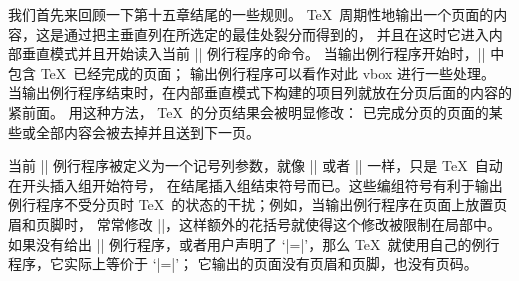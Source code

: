 \ninepoint %
\ddanger 我们首先来回顾一下第十五章结尾的一些规则。%
 \TeX\ 周期性地输出一个页面的内容，这是通过把主垂直列在所选定的最佳处裂分而得到的，
并且在这时它进入内部垂直模式并且开始读入当前 |\output| 例行程序的命令。%
当输出例行程序开始时，|| 中包含 \TeX\ 已经完成的页面；
输出例行程序可以看作对此 vbox 进行一些处理。%
当输出例行程序结束时，在内部垂直模式下构建的项目列就放在分页后面的内容的紧前面。%
用这种方法， \TeX\ 的分页结果会被明显修改：
已完成分页的页面的某些或全部内容会被去掉并且送到下一页。

\ddanger 当前 |\output| 例行程序被定义为一个记号列参数，就像 |\everypar|
或者 |\errhelp| 一样，只是 \TeX\ 自动在开头插入组开始符号，
在结尾插入组结束符号而已。这些编组符号有利于输出例行程序不受分页时 \TeX\
的状态的干扰；例如，当输出例行程序在页面上放置页眉和页脚时，
常常修改 |\baselineskip|，这样额外的花括号就使得这个修改被限制在局部中。
如果没有给出 |\output| 例行程序，或者用户声明了 `|\output={}|'，那么 \TeX\
就使用自己的例行程序，它实际上等价于 `|\output={\shipout{}}|'；
它输出的页面没有页眉和页脚，也没有页码。

